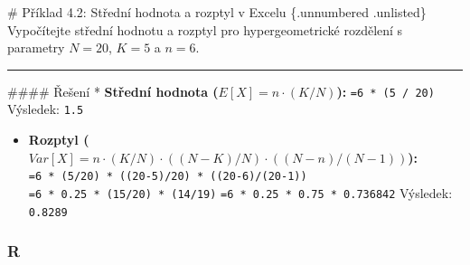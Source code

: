\documentclass[
  czech,
  11pt,
  letterpaper,
  DIV=11,
  numbers=noendperiod]{scrreprt}
\providecommand{\tightlist}{%
  \setlength{\itemsep}{0pt}\setlength{\parskip}{0pt}}
\begin{document}
\begin{tcolorbox}[enhanced jigsaw, arc=.35mm, bottomrule=.15mm, bottomtitle=1mm, breakable, colback=white, colbacktitle=quarto-callout-note-color!10!white, colframe=quarto-callout-note-color-frame, coltitle=black, left=2mm, leftrule=.75mm, opacityback=0, opacitybacktitle=0.6, rightrule=.15mm, title=\textcolor{quarto-callout-note-color}{\faInfo}\hspace{0.5em}{Poznámka}, titlerule=0mm, toprule=.15mm, toptitle=1mm]

\# Příklad 4.2: Střední hodnota a rozptyl v Excelu \{.unnumbered
.unlisted\} Vypočítejte střední hodnotu a rozptyl pro hypergeometrické
rozdělení s parametry \(N=20\), \(K=5\) a \(n=6\).

\begin{center}\rule{0.5\linewidth}{0.5pt}\end{center}

\#\#\#\# Řešení * \textbf{Střední hodnota (\(E[X] = n \cdot (K/N)\)):}
\texttt{=6\ *\ (5\ /\ 20)} Výsledek: \texttt{1.5}

\begin{itemize}
\tightlist
\item
  \textbf{Rozptyl
  (\(Var[X] = n \cdot (K/N) \cdot ((N-K)/N) \cdot ((N-n)/(N-1))\)):}
  \texttt{=6\ *\ (5/20)\ *\ ((20-5)/20)\ *\ ((20-6)/(20-1))}
  \texttt{=6\ *\ 0.25\ *\ (15/20)\ *\ (14/19)}
  \texttt{=6\ *\ 0.25\ *\ 0.75\ *\ 0.736842} Výsledek: \texttt{0.8289}
\end{itemize}

\end{tcolorbox}

\subsubsection*{R}\label{r-3}
\end{document}
